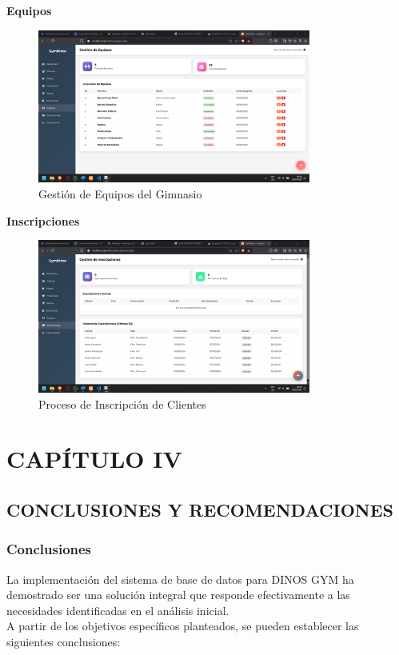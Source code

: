 \documentclass[12pt, letterpaper]{article}
\begin{document}
\textbf{Equipos}
\begin{figure}[ht]
\centering
\includegraphics[width=0.8\textwidth]{equipos.png}
\caption{Gestión de Equipos del Gimnasio}
\label{fig:equipos}
\end{figure}
\newpage

\textbf{Inscripciones}
\begin{figure}[ht]
\centering
\includegraphics[width=0.8\textwidth]{inscripciones.png}
\caption{Proceso de Inscripción de Clientes}
\label{fig:inscripciones}
\end{figure}
\newpage

\section*{CAPÍTULO IV}
\setcounter{section}{4}
\subsection{CONCLUSIONES Y RECOMENDACIONES}
\subsubsection{Conclusiones}
La implementación del sistema de base de datos para DINOS GYM ha demostrado ser una solución integral que responde efectivamente a las necesidades identificadas en el análisis inicial.\\ 
A partir de los objetivos específicos planteados, se pueden establecer las siguientes conclusiones:
\end{document}
